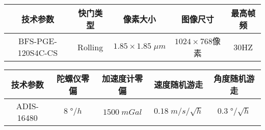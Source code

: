 \begin{table*}[htbp]
  \centering
  \caption{}
  \label{tab:camera}
  \normf
  \begin{tabular}{c|cccc}
    \hline
    {技术参数}             & {快门类型}            & {像素大小} & {图像尺寸} & {最高帧频} \\ \hline
    {BFS-PGE-120S4C-CS}    &
    Rolling                & $
    1.85\times1.85\;\mu m$ & $1024\times768${像素} & 30HZ                                 \\ 	\hline
  \end{tabular}
\end{table*}
\begin{table*}[htbp]
  \centering
  \caption{}
  \label{tab:imu}
  \normf
  \begin{tabular}{c|cccc}
    \hline
    {技术参数}   & {陀螺仪零偏} & {加速度计零偏} & {速度随机游走}       & {角度随机游走}    \\ \hline
    {ADIS-16480} & $8\;°/h$     & $1500\;mGal$   & $0.18\;m/s/\sqrt{h}$ & $0.3\;°/\sqrt{h}$ \\ 	\hline
  \end{tabular}
\end{table*}


